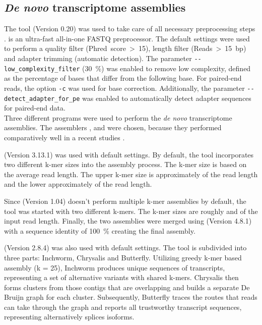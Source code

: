 \documentclass[12pt,a4paper,english]{article}
\begin{document}
\subsection{\textit{De novo} transcriptome assemblies}
	\label{ssec:assemblies}
	The tool \fastp (Version 0.20) was used to take care of all necessary preprocessing steps \citep{fastp:18}. \fastp is an ultra-fast all-in-one FASTQ preprocessor. The default settings were used to perform a quality filter (Phred~score~>~15), length filter (Reads~>~15~bp) and adapter trimming (automatic detection). The parameter \texttt{-{}-low\_complexity\_filter} (30~\%) was enabled to remove low complexity, defined as the percentage of bases that differ from the following base. For paired-end reads, the option \texttt{-c} was used for base correction. Additionally, the parameter \texttt{-{}-detect\_adapter\_for\_pe} was enabled to automatically detect adapter sequences for paired-end data.\\
	
	\noindent
	Three different programs were used to perform the \textit{de novo} transcriptome assemblies. The assemblers \spades \citep{rnaSPAdes:18}, \soap \citep{SOAPdenovo-Trans:14} and \trinity \citep{Trinity:11} were chosen, because they performed comparatively well in a recent studies \citep{hoelzer:19}.
	
	\spades (Version 3.13.1) was used with default settings. By default, the tool incorporates two different k-mer sizes into the assembly process. 
	The k-mer size is based on the average read length. The upper k-mer size is approximately  of the read length and the lower approximately  of the read length.
	
	Since \soap (Version 1.04) doesn't perform multiple k-mer assemblies by default, the tool was started with two different k-mers. The k-mer sizes are roughly  and  of the input read length. Finally, the two assemblies were merged using \cdhit (Version 4.8.1) \citep{cd-hit:06,cd-hit:12} with a sequence identity of 100~\% creating the final \soap assembly.
	
	\trinity (Version 2.8.4) was also used with default settings. The tool is subdivided into three parts: Inchworm, Chrysalis and Butterfly. Utilizing greedy k-mer based assembly (k = 25), Inchworm produces unique sequences of transcripts, representing a set of alternative variants with shared k-mers.
	Chrysalis then forms clusters from those contigs that are overlapping and builds a separate De Bruijn graph for each cluster.
	Subsequently, Butterfly traces the routes that reads can take through the graph and reports all trustworthy transcript sequences, representing alternatively splices isoforms.\\
	
\end{document}

